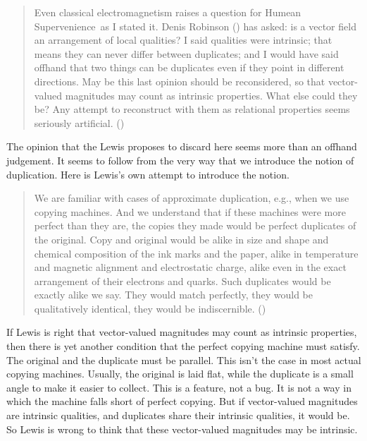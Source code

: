 \documentclass[
  11pt,
  letterpaper,
  DIV=11,
  numbers=noendperiod,
  twoside]{scrartcl}
\begin{document}
\begin{quote}
Even classical electromagnetism raises a question for Humean
Supervenience~as I stated it. Denis Robinson
() has asked: is a vector field an
arrangement of local qualities? I said qualities were intrinsic; that
means they can never differ between duplicates; and I would have said
offhand that two things can be duplicates even if they point in
different directions. May be this last opinion should be reconsidered,
so that vector-valued magnitudes may count as intrinsic properties. What
else could they be? Any attempt to reconstruct with them as relational
properties seems seriously artificial. ()
\end{quote}

The opinion that the Lewis proposes to discard here seems more than an
offhand judgement. It seems to follow from the very way that we
introduce the notion of duplication. Here is Lewis's own attempt to
introduce the notion.

\begin{quote}
We are familiar with cases of approximate duplication, e.g., when we use
copying machines. And we understand that if these machines were more
perfect than they are, the copies they made would be perfect duplicates
of the original. Copy and original would be alike in size and shape and
chemical composition of the ink marks and the paper, alike in
temperature and magnetic alignment and electrostatic charge, alike even
in the exact arrangement of their electrons and quarks. Such duplicates
would be exactly alike we say. They would match perfectly, they would be
qualitatively identical, they would be indiscernible.
()
\end{quote}

If Lewis is right that vector-valued magnitudes may count as intrinsic
properties, then there is yet another condition that the perfect copying
machine must satisfy. The original and the duplicate must be parallel.
This isn't the case in most actual copying machines. Usually, the
original is laid flat, while the duplicate is a small angle to make it
easier to collect. This is a feature, not a bug. It is not a way in
which the machine falls short of perfect copying. But if vector-valued
magnitudes are intrinsic qualities, and duplicates share their intrinsic
qualities, it would be. So Lewis is wrong to think that these
vector-valued magnitudes may be intrinsic.
\end{document}
